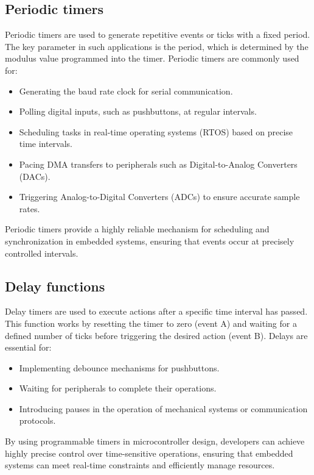\subsection{Periodic timers}
Periodic timers are used to generate repetitive events or ticks with a fixed period. 
The key parameter in such applications is the period, which is determined by the modulus value programmed into the timer. 
Periodic timers are commonly used for:
\begin{itemize}
    \item Generating the baud rate clock for serial communication.
    \item Polling digital inputs, such as pushbuttons, at regular intervals.
    \item Scheduling tasks in real-time operating systems (RTOS) based on precise time intervals.
    \item Pacing DMA transfers to peripherals such as Digital-to-Analog Converters (DACs).
    \item Triggering Analog-to-Digital Converters (ADCs) to ensure accurate sample rates.
\end{itemize}
Periodic timers provide a highly reliable mechanism for scheduling and synchronization in embedded systems, ensuring that events occur at precisely controlled intervals.

\subsection{Delay functions}
Delay timers are used to execute actions after a specific time interval has passed. 
This function works by resetting the timer to zero (event A) and waiting for a defined number of ticks before triggering the desired action (event B).
Delays are essential for:
\begin{itemize}
    \item Implementing debounce mechanisms for pushbuttons.
    \item Waiting for peripherals to complete their operations.
    \item Introducing pauses in the operation of mechanical systems or communication protocols.
\end{itemize}
By using programmable timers in microcontroller design, developers can achieve highly precise control over time-sensitive operations, ensuring that embedded systems can meet real-time constraints and efficiently manage resources.

